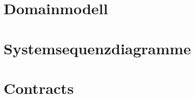 \documentclass[a4paper,12pt,halfparskip,DIV14]{scrartcl}
\begin{document}

\section{Domainmodell}\label{cha:domainmodell} %


\section{Systemsequenzdiagramme}\label{cha:systemsequenzdiagramme} %


\section{Contracts}\label{cha:contracts} %

\end{document}
